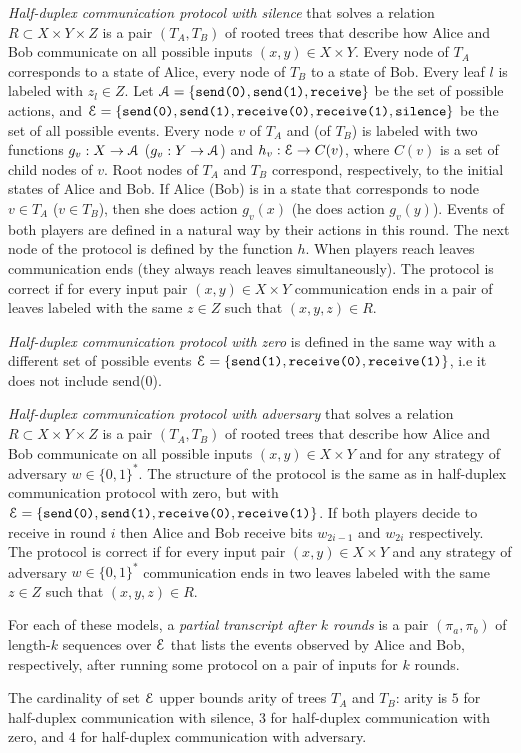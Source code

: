 \begin{definition}\label{ref:hds-protocol}
\emph{Half-duplex communication protocol with silence} that solves a relation $R\subset X\times Y \times Z$ is a pair 
$(T_A, T_B)$ of rooted trees that describe how Alice and Bob communicate
on all possible inputs $(x,y)\in X\times Y$.
Every node of $T_A$ corresponds to a state of Alice, every node of $T_B$ 
to a state of Bob.  Every leaf $l$ is labeled with $z_l\in Z$. 
Let $\mathcal{A} = \{\texttt{send(0)}, \texttt{send(1)}, \texttt{receive}\}$ be the set of possible actions, and $\mathcal{E} = \{\texttt{send(0)}, \texttt{send(1)},
\texttt{receive(0)}, \texttt{receive(1)}, \texttt{silence}\}$ 
be the set of all possible events.  Every node $v$ of $T_A$ and 
(of $T_B$) is labeled with two functions $g_v: X\to \mathcal{A}$ 
($g_v: Y\to \mathcal{A}$) and $h_v: \mathcal{E}\to C(v)$, where $C(v)$ 
is a set of child nodes of $v$.  Root nodes of $T_A$ and
$T_B$ correspond, respectively, to the initial states of Alice and Bob.
If Alice (Bob) is in a state that corresponds to node $v\in T_A$ ($v\in T_B$), 
then she does action $g_v(x)$ (he does action $g_v(y)$). 
Events of both players are defined in a natural way by their actions in this round. 
The next node of the protocol is defined by the function $h$.
When players reach leaves communication ends (they always reach leaves simultaneously). 
The protocol is correct if for every input pair 
$(x,y)\in X\times Y$ communication ends 
in a pair of leaves labeled with the same 
$z\in Z$ such that $(x,y,z) \in R$.

\emph{Half-duplex communication protocol with zero} is defined in the 
same way with a different set of possible events 
$\mathcal{E} = \{\texttt{send(1)}, \texttt{receive(0)}, \texttt{receive(1)}\}$,
i.e it does not include send(0).

\emph{Half-duplex communication protocol with adversary} 
that solves a relation $R\subset X\times Y \times Z$ is a pair 
$(T_A, T_B)$ of rooted trees that describe how Alice and Bob communicate
on all possible inputs $(x,y)\in X\times Y$ and for any strategy of 
adversary $w\in\{0,1\}^*$. The structure of the protocol is the same
as in half-duplex communication protocol with zero, but with 
$\mathcal{E} = \{\texttt{send(0)}, \texttt{send(1)}, \texttt{receive(0)}, \texttt{receive(1)}\}$. 
If both players decide to receive in round $i$ then Alice and Bob receive
bits $w_{2i-1}$ and $w_{2i}$ respectively.
The protocol is correct if for every input pair 
$(x,y)\in X\times Y$ and any strategy of 
adversary $w\in\{0,1\}^*$ communication ends
in two leaves labeled with the same $z\in Z$ such that $(x,y,z) \in R$.

For each of these models, a \emph{partial transcript after $k$ rounds} is a pair $(\pi_a,\pi_b)$ of length-$k$ sequences over $\mathcal{E}$ that lists the events observed by Alice and Bob, respectively, after running some protocol on a pair of inputs for $k$ rounds.
\end{definition}
The cardinality of set $\mathcal{E}$ upper bounds arity of trees $T_A$ and $T_B$: arity is $5$ for half-duplex communication with silence,
$3$ for half-duplex communication with zero, and $4$ for half-duplex communication with adversary.

